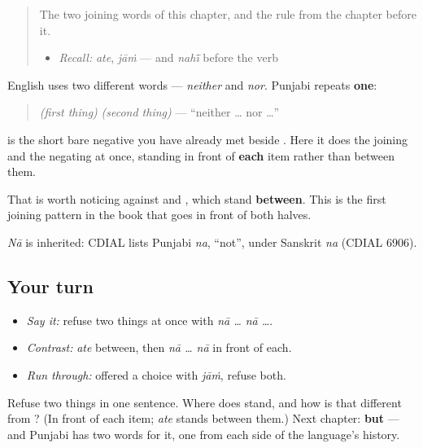 \label{lesson:PA-C38-na-na}



\begin{quote}
The two joining words of this chapter, and the rule from the chapter before it.

\begin{itemize}
\raggedright
  \item \emph{Recall:} \emph{ate}, \emph{jāṁ} — and \emph{nahī̃} before the verb
\end{itemize}
\end{quote}

\begin{cousinweb}
English uses two different words — \emph{neither} and \emph{nor}. Punjabi repeats \textbf{one}:

\begin{quote}
\textbf{} \emph{(first thing)} \textbf{} \emph{(second thing)} — \textquotedblleft{}neither … nor …\textquotedblright{}
\end{quote}

\textbf{} is the short bare negative you have already met beside \textbf{}. Here it does the joining and the negating at once, standing in front of \textbf{each} item rather than between them.

That is worth noticing against \textbf{} and \textbf{}, which stand \textbf{between}. This is the first joining pattern in the book that goes in front of both halves.

\emph{Nā} is inherited: CDIAL lists Punjabi \emph{na}, \textquotedblleft{}not\textquotedblright{}, under Sanskrit \emph{na} (CDIAL 6906).
\end{cousinweb}

\subsection*{Your turn}
\begin{itemize}
\raggedright
  \item \emph{Say it:} refuse two things at once with \emph{nā … nā …}.
  \item \emph{Contrast:} \emph{ate} between, then \emph{nā … nā} in front of each.
  \item \emph{Run through:} offered a choice with \emph{jāṁ}, refuse both.
\end{itemize}

\begin{tcolorbox}[breakable,colback=teal!4,colframe=teal!35!black,title={Before you move on}]
Refuse two things in one sentence. Where does \textbf{} stand, and how is that different from \textbf{}? (In front of each item; \emph{ate} stands between them.) Next chapter: \textbf{but} — and Punjabi has two words for it, one from each side of the language's history.
\end{tcolorbox}
